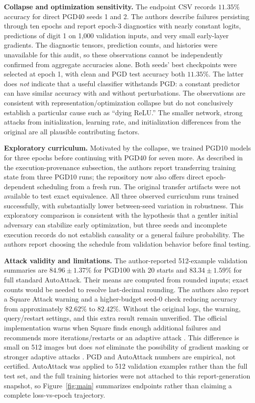 \documentclass[11pt,a4paper]{article}
\begin{document}
\textbf{Collapse and optimization sensitivity.} The endpoint CSV records $11.35\%$ accuracy for direct PGD40 seeds 1 and 2. The authors describe failures persisting through ten epochs and report epoch-3 diagnostics with nearly constant logits, predictions of digit 1 on 1,000 validation inputs, and very small early-layer gradients. The diagnostic tensors, prediction counts, and histories were unavailable for this audit, so these observations cannot be independently confirmed from aggregate accuracies alone. Both seeds' best checkpoints were selected at epoch 1, with clean and PGD test accuracy both $11.35\%$. The latter does \emph{not} indicate that a useful classifier withstands PGD: a constant predictor can have similar accuracy with and without perturbations. The observations are consistent with representation/optimization collapse but do not conclusively establish a particular cause such as ``dying ReLU.'' The smaller network, strong attacks from initialization, learning rate, and initialization differences from the original are all plausible contributing factors.

\textbf{Exploratory curriculum.} Motivated by the collapse, we trained PGD10 models for three epochs before continuing with PGD40 for seven more. As described in the execution-provenance subsection, the authors report transferring training state from three PGD10 runs; the repository now also offers direct epoch-dependent scheduling from a fresh run. The original transfer artifacts were not available to test exact equivalence. All three observed curriculum runs trained successfully, with substantially lower between-seed variation in robustness. This exploratory comparison is consistent with the hypothesis that a gentler initial adversary can stabilize early optimization, but three seeds and incomplete execution records do not establish causality or a general failure probability. The authors report choosing the schedule from validation behavior before final testing.

\textbf{Attack validity and limitations.} The author-reported 512-example validation summaries are $84.96\pm1.37\%$ for PGD100 with 20 starts and $83.34\pm1.59\%$ for full standard AutoAttack. Their means are computed from rounded inputs; exact counts would be needed to resolve last-decimal rounding. The authors also report a Square Attack warning and a higher-budget seed-0 check reducing accuracy from approximately $82.62\%$ to $82.42\%$. Without the original logs, the warning, query/restart settings, and this extra result remain unverified. The official implementation warns when Square finds enough additional failures and recommends more iterations/restarts or an adaptive attack \citep{autoattack_code}. This difference is small on 512 images but does \emph{not} eliminate the possibility of gradient masking or stronger adaptive attacks \citep{croce2020reliable}. PGD and AutoAttack numbers are empirical, not certified. AutoAttack was applied to 512 validation examples rather than the full test set, and the full training histories were not attached to this report-generation snapshot, so Figure~\ref{fig:main} summarizes endpoints rather than claiming a complete loss-vs-epoch trajectory.
\end{document}
